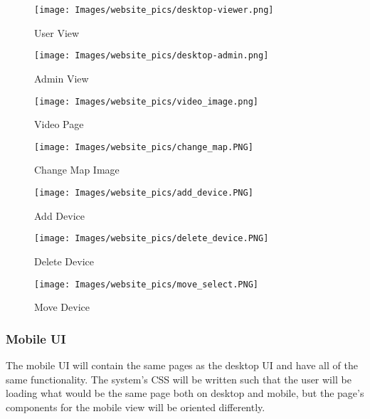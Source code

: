 \documentclass[onecolumn, draftclsnofoot,10pt, compsoc]{IEEEtran}
\begin{document}
        \begin{figure}[H]
            \centering
            \texttt{[image: Images/website\_pics/desktop-viewer.png]}
            \centering\caption{User View}
            \label{fig:User}
        \end{figure}
        \begin{figure}[H]
            \centering
            \texttt{[image: Images/website\_pics/desktop-admin.png]}
            \centering\caption{Admin View}
            \label{fig:Admin}
        \end{figure}
        
        \begin{figure}[H]
            \centering
            \texttt{[image: Images/website\_pics/video\_image.png]}
            \centering\caption{Video Page}
            \label{fig:Video}
        \end{figure}
        
         \begin{figure}[H]
            \centering
            \texttt{[image: Images/website\_pics/change\_map.PNG]}
            \centering\caption{Change Map Image}
            \label{fig:Map}
        \end{figure}
        
         \begin{figure}[H]
            \centering
            \texttt{[image: Images/website\_pics/add\_device.PNG]}
            \centering\caption{Add Device}
            \label{fig:Add}
        \end{figure}
        
         \begin{figure}[H]
            \centering
            \texttt{[image: Images/website\_pics/delete\_device.PNG]}
            \centering\caption{Delete Device}
            \label{fig:Delete}
        \end{figure}
        
        \begin{figure}[H]
            \centering
            \texttt{[image: Images/website\_pics/move\_select.PNG]}
            \centering\caption{Move Device}
            \label{fig:Move}
        \end{figure}
        
        \subsubsection{Mobile UI}
        The mobile UI will contain the same pages as the desktop UI and have all of the same functionality. The system's CSS will be written such that the user will be loading what would be the same page both on desktop and mobile, but the page's components for the mobile view will be oriented differently. 
       
\end{document}
